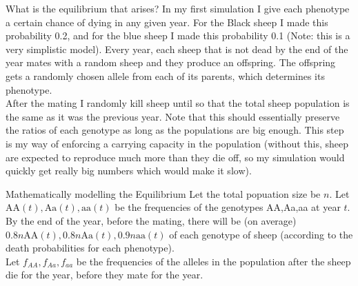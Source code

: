 \documentclass[xcolor=x11names, svgnames, rgb]{beamer}
\newcommand{\dom}{\text{AA}}
\newcommand{\het}{\text{Aa}}
\newcommand{\rec}{\text{aa}}
\begin{document}
\begin{frame}[t]{What is the equilibrium that arises?}
	In my first simulation I give each phenotype a certain chance of dying in any given year.	
	For the Black sheep I made this probability 0.2, and for the blue sheep I made this probability 0.1 (Note: this is a very simplistic model). 
	Every year, each sheep that is not dead by the end of the year mates with a random sheep and they produce an offspring. The offspring gets a randomly chosen allele from each of its parents, which determines its phenotype.\\
	After the mating I randomly kill sheep until so that the total sheep
	population is the same as it was the previous year. Note that this should
	essentially preserve the ratios of each genotype as long as the populations
	are big enough. This step is my way of enforcing a carrying capacity in the
	population (without this, sheep are expected to reproduce much more than they
	die off, so my simulation would quickly get really big numbers which would
	make it slow).
\end{frame}

\begin{frame}[t]{Mathematically modelling the Equilibrium}
	Let the total popuation size be $n$. Let $\dom(t), \het(t), \rec(t)$ be the frequencies of the genotypes AA,Aa,aa at year $t$.
	By the end of the year, before the mating, there will be (on average) $0.8 n \dom(t),0.8 n \het(t),0.9 n\rec(t)$ of each genotype of sheep (according to the death probabilities for each phenotype).\\
	Let $f_{AA},f_{Aa},f_{aa}$ be the frequencies of the alleles in the population after the sheep die for the year, before they mate for the year.
\end{frame}


\end{document}
